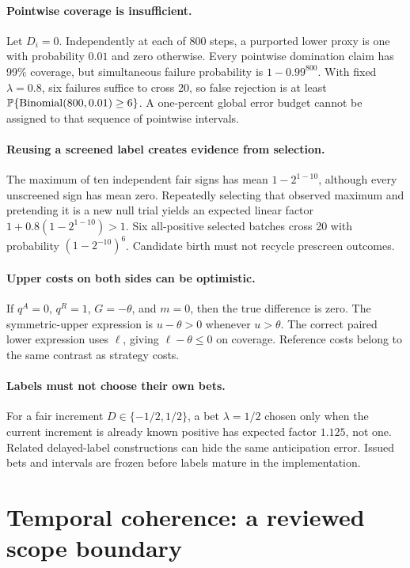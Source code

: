 \paragraph{Pointwise coverage is insufficient.}
Let $D_i=0$. Independently at each of 800 steps, a purported lower proxy is one
with probability $0.01$ and zero otherwise. Every pointwise domination claim
has 99\% coverage, but simultaneous failure probability is
$1-0.99^{800}$. With fixed $\lambda=0.8$, six failures suffice to cross 20,
so false rejection is at least
$\mathbb{P}\{\operatorname{Binomial}(800,0.01)\geq6\}$. A one-percent global error
budget cannot be assigned to that sequence of pointwise intervals.

\paragraph{Reusing a screened label creates evidence from selection.}
The maximum of ten independent fair signs has mean $1-2^{1-10}$, although
every unscreened sign has mean zero. Repeatedly selecting that observed maximum
and pretending it is a new null trial yields an expected linear factor
$1+0.8(1-2^{1-10})>1$. Six all-positive selected batches cross 20 with
probability $(1-2^{-10})^6$. Candidate birth must not recycle prescreen outcomes.

\paragraph{Upper costs on both sides can be optimistic.}
If $q^A=0$, $q^R=1$, $G=-\theta$, and $m=0$, then the true difference is
zero. The symmetric-upper expression is $u-\theta>0$ whenever $u>\theta$.
The correct paired lower expression uses $\ell$, giving $\ell-\theta\leq0$
on coverage. Reference costs belong to the same contrast as strategy costs.

\paragraph{Labels must not choose their own bets.}
For a fair increment $D\in\{-1/2,1/2\}$, a bet $\lambda=1/2$ chosen only when the
current increment is already known positive has expected factor $1.125$, not one.
Related delayed-label constructions can hide the same anticipation error.
Issued bets and intervals are frozen before labels mature in the implementation.

\section{Temporal coherence: a reviewed scope boundary}

